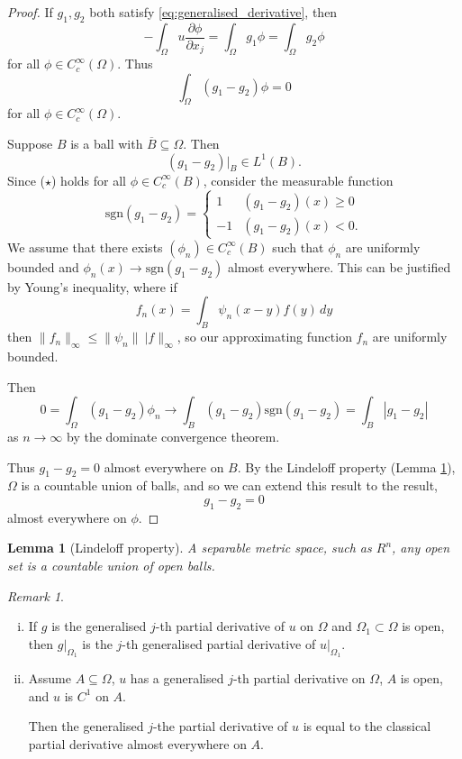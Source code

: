 \documentclass[10pt, oneside, reqno]{amsart}
\theoremstyle{plain}%
\newtheorem{lem}[thm]{Lemma}
\numberwithin{equation}{section}
\theoremstyle{definition}
\theoremstyle{remark}
\newtheorem*{rem}{Remark}
\begin{document}
\begin{proof}
    If $g_1, g_2$ both satisfy \eqref{eq:generalised_derivative}, then \[
        -\int_\Omega u \frac{\partial \phi}{\partial x_j} = \int_\Omega g_1 \phi = \int_\Omega g_2 \phi
    \] for all $\phi \in C_c^\infty(\Omega)$.  Thus \[
        \int_\Omega (g_1 - g_2) \phi = 0
        \tag{$\star$}
    \] for all $\phi \in C_c^\infty(\Omega)$.
    
    Suppose $B$ is a ball with $\overline B \subseteq \Omega$.  Then \[
        (g_1 - g_2) |_B \in L^1(B).  
    \]   Since ($\star$) holds for all $\phi \in C_c^\infty(B)$, consider the measurable function \[
        \text{sgn}(g_1 - g_2) = \begin{cases}
            1 & (g_1 - g_2)(x) \geq 0 \\
            -1 & (g_1 - g_2)(x) < 0.
        \end{cases}  
    \]  
    We assume that there exists $(\phi_n) \in C_c^\infty(B)$ such that $\phi_n$ are uniformly bounded and $\phi_n(x) \rightarrow \text{sgn}(g_1 - g_2)$ almost everywhere.  This can be justified by Young's inequality, where if \[
        f_n(x) = \int_B \psi_n(x-y) f(y) \, dy
    \] then $\| f_n \|_\infty \leq \| \psi_n \| \ | f \|_\infty$, so our approximating function $f_n$ are uniformly bounded.
    
    Then \[
        0 = \int_\Omega (g_1 - g_2) \phi_n \rightarrow \int_B (g_1 - g_2) \text{sgn}(g_1 - g_2) = \int_B |g_1 - g_2 |
    \] as $n \rightarrow \infty$ by the dominate convergence theorem. 
    
    Thus $g_1 - g_2 = 0$ almost everywhere on $B$.  By the Lindeloff property (Lemma \ref{lem:lindeloff}), $\Omega$ is a countable union of balls, and so we can extend this result to the result, \[
        g_1 - g_2 = 0
    \] almost everywhere on $\phi$.  
\end{proof}

\begin{lem}[Lindeloff property]
    \label{lem:lindeloff}
    A separable metric space, such as $R^n$, any open set is a countable union of open balls.
\end{lem} 

\begin{rem}{\ }
    \begin{enumerate}[(i)]
        \item If $g$ is the generalised $j$-th partial derivative of $u$ on $\Omega$ and $\Omega_1 \subset \Omega$ is open, then $g |_{\Omega_1}$ is the $j$-th generalised partial derivative of $u|_{\Omega_1}$.
        \item Assume $A \subseteq \Omega$, $u$ has a generalised $j$-th partial derivative on $\Omega$, $A$ is open, and $u$ is $C^1$ on $A$. 
        
        Then the generalised $j$-the partial derivative of $u$ is equal to the classical partial derivative almost everywhere on $A$.
    \end{enumerate}
\end{rem} 
\end{document}
